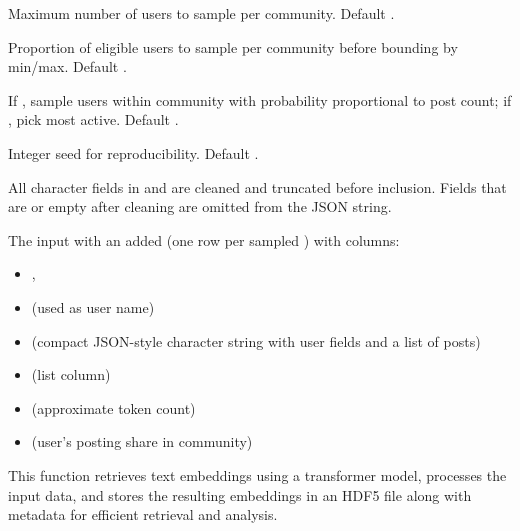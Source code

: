 \documentclass[a4paper]{book}
\begin{document}
\begin{Arguments}
\begin{ldescription}
\item[\code{max\_n\_users}] Maximum number of users to sample per community. Default .

\item[\code{sampling\_ratio\_users}] Proportion of eligible users to sample per community before bounding by min/max. Default .

\item[\code{strat\_sample}] If , sample users within community with probability proportional to post count; if , pick most active. Default .

\item[\code{seed}] Integer seed for reproducibility. Default .
\end{ldescription}
\end{Arguments}
%
\begin{Details}
All character fields in  and  are cleaned and truncated
before inclusion. Fields that are  or empty after cleaning are omitted from the JSON string.
\end{Details}
%
\begin{Value}
The input  with an added  
(one row per sampled ) with columns:
\begin{itemize}

\item{} , 
\item{}  (used as user name)
\item{}  (compact JSON-style character string with user fields and a list of posts)
\item{}  (list column)
\item{}  (approximate token count)
\item{}  (user's posting share in community)

\end{itemize}

\end{Value}
%
\begin{Description}
This function retrieves text embeddings using a transformer model, processes the 
input data, and stores the resulting embeddings in an HDF5 file along with metadata for efficient 
retrieval and analysis.
\end{Description}
\end{document}
